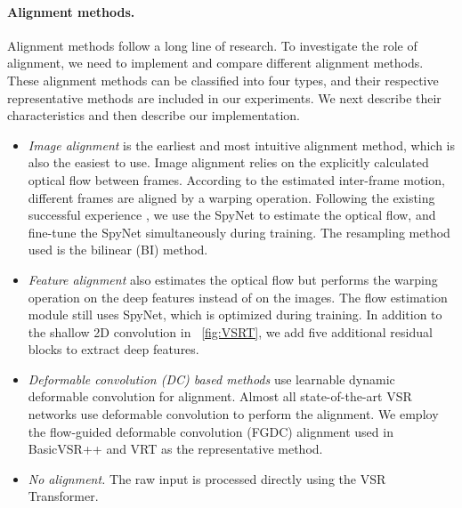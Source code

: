 \documentclass{article}
\begin{document}
\vspace{-3mm}
\paragraph{Alignment methods.}
\label{sec:alignment}
Alignment methods follow a long line of research.
To investigate the role of alignment, we need to implement and compare different alignment methods. 
These alignment methods can be classified into four types, and their respective representative methods are included in our experiments.
We next describe their characteristics and then describe our implementation.


\vspace{-3mm}
\begin{itemize}
\setlength{\itemsep}{2pt}
\setlength{\parsep}{0pt}
\setlength{\parskip}{0pt}
    \item \emph{Image alignment} is the earliest and most intuitive alignment method, which is also the easiest to use.
Image alignment relies on the explicitly calculated optical flow between frames.
According to the estimated inter-frame motion, different frames are aligned by a warping operation.
Following the existing successful experience \cite{xue2019video,chan2021basicvsr}, we use the SpyNet \cite{ranjan2017optical} to estimate the optical flow, and fine-tune the SpyNet simultaneously during training.
The resampling method used is the bilinear (BI) method.


    \item \emph{Feature alignment} also estimates the optical flow but performs the warping operation on the deep features instead of on the images. 
The flow estimation module still uses SpyNet, which is optimized during training. 
In addition to the shallow 2D convolution in \figurename~\ref{fig:VSRT}, we add five additional residual blocks \cite{he2016deep} to extract deep features.


    \item \emph{Deformable convolution (DC) based methods} use learnable dynamic deformable convolution for alignment.
Almost all state-of-the-art VSR networks use deformable convolution to perform the alignment.
We employ the flow-guided deformable convolution (FGDC) alignment used in BasicVSR++ \cite{chan2021basicvsr++} and VRT \cite{liang2022vrt} as the representative method.

    \item \emph{No alignment.} The raw input is processed directly using the VSR Transformer.
    
\end{itemize}
\end{document}
